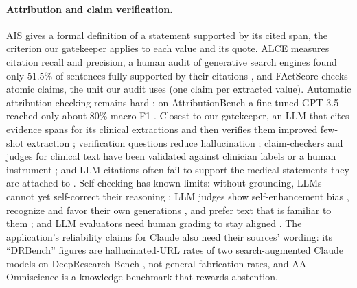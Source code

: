 \documentclass{article} %
\begin{document}
\paragraph{Attribution and claim verification.} AIS \citep{rashkin2023_ais} gives a formal definition of a statement supported by its cited span, the criterion our gatekeeper applies to each value and its quote. ALCE \citep{gao2023_alce} measures citation recall and precision, a human audit of generative search engines found only 51.5\% of sentences fully supported by their citations \citep{Liu2023EvaluatingVerifiability}, and FActScore \citep{min2023_factscore} checks atomic claims, the unit our audit uses (one claim per extracted value). Automatic attribution checking remains hard \citep{Honovich2022TrueReevaluating,Yue2023AutomaticEvaluation,Tang2024MinicheckEfficient}: on AttributionBench a fine-tuned GPT-3.5 reached only about 80\% macro-F1 \citep{Li2024AttributionbenchHow}. Closest to our gatekeeper, an LLM that cites evidence spans for its clinical extractions and then verifies them improved few-shot extraction \citep{gero2023_self_verification}; verification questions reduce hallucination \citep{dhuliawala2024_cove}; claim-checkers and judges for clinical text have been validated against clinician labels or a human instrument \citep{chung2025_verifact,Chung2026VerifyingFacts,croxford2025_clinical_llm_judge}; and LLM citations often fail to support the medical statements they are attached to \citep{wu2025_sourcecheckup}. Self-checking has known limits: without grounding, LLMs cannot yet self-correct their reasoning \citep{huang2024_no_self_correct}; LLM judges show self-enhancement bias \citep{zheng2023_llm_judge}, recognize and favor their own generations \citep{Panickssery2024LlmEvaluators}, and prefer text that is familiar to them \citep{Wataoka2024SelfpreferenceBias}; and LLM evaluators need human grading to stay aligned \citep{Shankar2024WhoValidates}. The application's reliability claims for Claude also need their sources' wording: its ``DRBench'' figures are hallucinated-URL rates of two search-augmented Claude models \citep{rao2026_reference_hallucination} on DeepResearch Bench \citep{du2025_deepresearchbench}, not general fabrication rates, and AA-Omniscience \citep{jackson2025_aa_omniscience} is a knowledge benchmark that rewards abstention.
\end{document}
